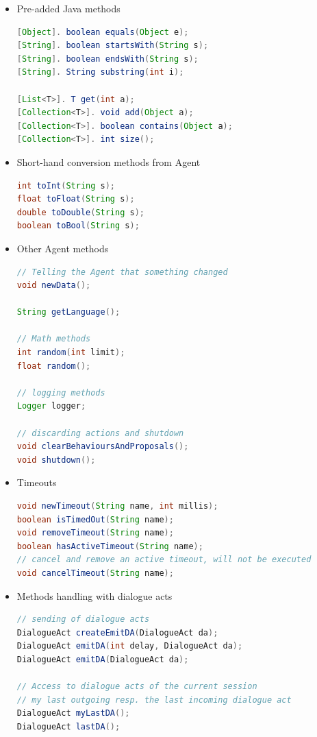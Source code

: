 \begin{itemize}
\item Pre-added Java methods
\begin{lstlisting}[language=Java]
[Object]. boolean equals(Object e);
[String]. boolean startsWith(String s);
[String]. boolean endsWith(String s);
[String]. String substring(int i);

[List<T>]. T get(int a);
[Collection<T>]. void add(Object a);
[Collection<T>]. boolean contains(Object a);
[Collection<T>]. int size();
\end{lstlisting}

\item Short-hand conversion methods from Agent
\begin{lstlisting}[language=Java]
int toInt(String s);
float toFloat(String s);
double toDouble(String s);
boolean toBool(String s);
\end{lstlisting}

\item Other Agent methods
\begin{lstlisting}[language=Java]
// Telling the Agent that something changed
void newData();

String getLanguage();

// Math methods
int random(int limit);
float random();

// logging methods
Logger logger;

// discarding actions and shutdown
void clearBehavioursAndProposals();
void shutdown();
\end{lstlisting}

\item Timeouts
\begin{lstlisting}[language=Java]
void newTimeout(String name, int millis);
boolean isTimedOut(String name);
void removeTimeout(String name);
boolean hasActiveTimeout(String name);
// cancel and remove an active timeout, will not be executed
void cancelTimeout(String name);
\end{lstlisting}

\item Methods handling with dialogue acts
\begin{lstlisting}[language=Java]
// sending of dialogue acts
DialogueAct createEmitDA(DialogueAct da);
DialogueAct emitDA(int delay, DialogueAct da);
DialogueAct emitDA(DialogueAct da);

// Access to dialogue acts of the current session
// my last outgoing resp. the last incoming dialogue act
DialogueAct myLastDA();
DialogueAct lastDA();


\end{lstlisting}
\end{itemize}
